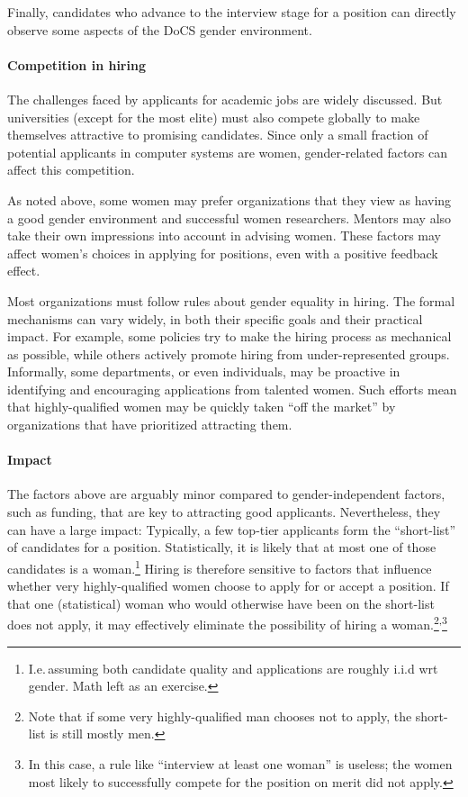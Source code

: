 \documentclass[a4paper,10pt,twocolumn]{article}
\begin{document}
Finally, candidates who advance to the interview stage for a position
can directly observe some aspects of the DoCS gender environment.

\paragraph{Competition in hiring} The challenges faced by applicants
for academic jobs are widely discussed.  But universities (except for
the most elite) must also compete globally to make themselves
attractive to promising candidates.  Since only a small fraction of
potential applicants in computer systems are women, gender-related
factors can affect this competition.

As noted above, some women may prefer organizations that they view as
having a good gender environment and successful women researchers.
Mentors may also take their own impressions into account in advising
women.  These factors may affect women's choices in applying for
positions, even with a positive feedback effect.

Most organizations must follow rules about gender equality in
hiring. The formal mechanisms can vary widely, in both their specific
goals and their practical impact.  For example, some policies try to
make the hiring process as mechanical as possible, while others
actively promote hiring from under-represented groups.  Informally,
some departments, or even individuals, may be proactive in identifying
and encouraging applications from talented women.  Such efforts mean
that highly-qualified women may be quickly taken ``off the market'' by
organizations that have prioritized attracting them.

\paragraph{Impact}
The factors above are arguably minor compared to gender-independent
factors, such as funding, that are key to attracting good applicants.
Nevertheless, they can have a large impact: Typically, a few top-tier
applicants form the ``short-list'' of candidates for a position.
Statistically, it is likely that at most one of those candidates is a
woman.\footnote{I.e.\,assuming both candidate quality and applications
are roughly i.i.d wrt gender.  Math left as an exercise.}  Hiring is
therefore sensitive to factors that influence whether very
highly-qualified women choose to apply for or accept a position.  If
that one (statistical) woman who would otherwise have been on the
short-list does not apply, it may effectively eliminate the
possibility of hiring a woman.\footnote{\label{foot:hire}Note that if
some very highly-qualified man chooses not to apply, the short-list is
still mostly men.}\textsuperscript{,}\footnote{In this case, a rule
like ``interview at least one woman'' is useless; the women most
likely to successfully compete for the position on merit did not
apply.}
\end{document}
